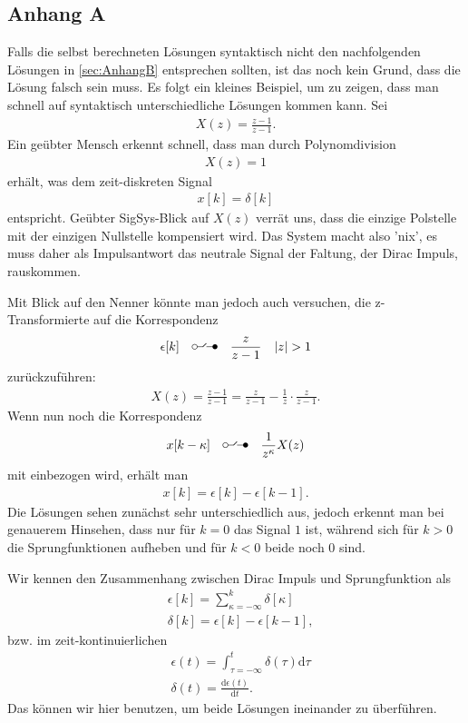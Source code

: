 \documentclass[11pt,a4paper,DIV=12]{scrartcl}
\renewcommand{\ztransf}{\mbox{\setlength{\unitlength}{0.1em}%
                            \begin{picture}(20,10)%
                              \put(2,3){\circle{4}}%
                              \put(4,3){\line(1,0){4.75}}%
                              \multiput(8.625,3.15)(0.25,0.25){11}{%
                                \makebox(0,0){\rmfamily\tiny .}}%
                              \put(17,3){\line(-1,0){5.75}}%
                              \put(18,3){\circle*{4}}%
                            \end{picture}%
                           }
                      }
\begin{document}
\subsection{Anhang A}
\label{sec:AnhangA}
Falls die selbst berechneten Lösungen syntaktisch nicht den nachfolgenden Lösungen in \ref{sec:AnhangB} entsprechen sollten, ist das noch kein Grund, dass die Lösung falsch sein muss. Es folgt ein kleines Beispiel, um zu zeigen, dass man schnell auf syntaktisch unterschiedliche Lösungen kommen kann.
Sei
\begin{align}
	X(z) = \frac{z-1}{z-1}.
\end{align}
Ein geübter Mensch erkennt schnell, dass man durch Polynomdivision
\begin{align}
	X(z)= 1
\end{align}
erhält, was dem zeit-diskreten Signal
\begin{align}
	x[k] = \delta[k]
\end{align}
entspricht.
%
Geübter SigSys-Blick auf $X(z)$ verrät uns, dass die einzige Polstelle mit der einzigen Nullstelle kompensiert wird. Das System macht also 'nix', es muss daher als Impulsantwort das neutrale Signal der Faltung, der Dirac Impuls, rauskommen.
%

Mit Blick auf den Nenner könnte man jedoch auch versuchen, die z-Transformierte auf die Korrespondenz
\begin{align}
	\epsilon[k]\quad\ztransf\quad\frac{z}{z-1}\quad |z| > 1
\end{align}
zurückzuführen:
\begin{align}
	X(z)=\frac{z-1}{z-1}=\frac{z}{z-1}-\frac{1}{z}\cdot\frac{z}{z-1}.
\end{align}
Wenn nun noch die Korrespondenz
\begin{align}
	x[k-\kappa]\quad\ztransf\quad\frac{1}{z^{\kappa}}X(z)
\end{align}
mit einbezogen wird, erhält man
\begin{align}
	x[k]=\epsilon[k]-\epsilon[k-1].
\end{align}
Die Lösungen sehen zunächst sehr unterschiedlich aus, jedoch erkennt man bei genauerem Hinsehen, dass nur für $k=0$ das Signal $1$ ist, während sich für $k>0$ die Sprungfunktionen aufheben und für $k<0$ beide noch $0$ sind.

Wir kennen den Zusammenhang zwischen Dirac Impuls und Sprungfunktion als
\begin{align}
&\epsilon[k] = \sum_{\kappa=-\infty}^{k} \delta[\kappa]\\
&\delta[k]=\epsilon[k]-\epsilon[k-1],
\end{align}
bzw. im zeit-kontinuierlichen
\begin{align}
&\epsilon(t) = \int_{\tau=-\infty}^{t} \delta(\tau) \mathrm{d}\tau\\
&\delta(t)=\frac{\mathrm{d} \epsilon(t)}{\mathrm{d} t}.
\end{align}
%
Das können wir hier benutzen, um beide Lösungen ineinander zu überführen.
\end{document}
